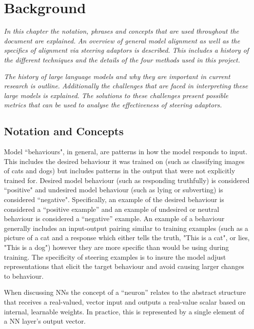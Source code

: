 \chapter{Background}
\label{ch:background}

\emph{In this chapter the notation, phrases and concepts that are used throughout the document are explained.}
\emph{An overview of general model alignment as well as the specifics of alignment via steering adaptors is described.}
\emph{This includes a history of the different techniques and the details of the four methods used in this project.}

\emph{The history of large language models and why they are important in current research is outline.}
\emph{Additionally the challenges that are faced in interpreting these large models is explained.}
\emph{The solutions to these challenges present possible metrics that can be used to analyse the effectiveness of steering adaptors.}

\section{Notation and Concepts}

Model ``behaviours", in general, are patterns in how the model responds to input.
This includes the desired behaviour it was trained on (such as classifying images of cats and dogs) but includes patterns in the output that were not explicitly trained for.
Desired model behaviour (such as responding truthfully) is considered ``positive" and undesired model behaviour (such as lying or subverting) is considered ``negative".
Specifically, an example of the desired behaviour is considered a ``positive example'' and an example of undesired or neutral behaviour is considered a ``negative'' example.
An example of a behaviour generally includes an input-output pairing similar to training examples (such as a picture of a cat and a response which either tells the truth, "This is a cat", or lies, "This is a dog") however they are more specific than would be using during training.
The specificity of steering examples is to insure the model adjust representations that elicit the target behaviour and avoid causing larger changes to behaviour.

When discussing NNs the concept of a ``neuron'' relates to the abstract structure that receives a real-valued, vector input and outputs a real-value scalar based on internal, learnable weights.
In practice, this is represented by a single element of a NN layer's output vector.

